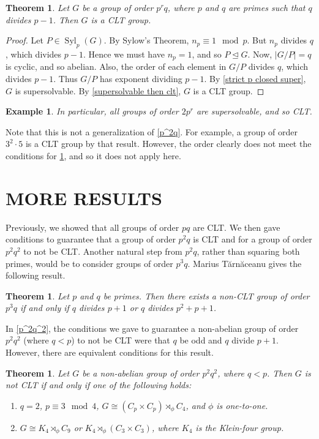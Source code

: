 \documentclass[12pt]{report}
\theoremstyle{newthm}
\newtheorem{Theorem}[lem]{Theorem}
\newtheorem{Example}[lem]{Example}
\DeclareMathOperator{\Syl}{Syl}
\begin{document}
\begin{Theorem}\label{p^rq clt} Let $G$ be a group of order $p^rq$, where $p$ and $q$ are primes such that $q$ divides $p-1$. Then $G$ is a CLT group.
\end{Theorem}

\begin{proof}
Let $P\in\Syl_p(G)$. By Sylow's Theorem, $n_p\equiv 1 \mod p$. But $n_p$ divides $q$, which divides $p-1$. Hence we must have $n_p=1$, and so $P\trianglelefteq G$. Now, $|G/P| = q$ is cyclic, and so abelian. Also, the order of each element in $G/P$ divides $q$, which divides $p-1$. Thus $G/P$ has exponent dividing $p-1$. By \cref{strict p closed super}, $G$ is supersolvable. By \cref{supersolvable then clt}, $G$ is a CLT group.
\end{proof}

\begin{Example}
In particular, all groups of order $2p^r$ are supersolvable, and so CLT.
\end{Example}

Note that this is not a generalization of \cref{p^2q}. For example, a group of order $3^2\cdot 5$ is a CLT group by that result. However, the order clearly does not meet the conditions for \cref{p^rq clt}, and so it does not apply here.


\newpage
\section{MORE RESULTS}
\bigskip

Previously, we showed that all groups of order $pq$ are CLT. We then gave conditions to guarantee that a group of order $p^2q$ is CLT and for a group of order $p^2q^2$ to not be CLT. Another natural step from $p^2q$, rather than squaring both primes, would be to consider groups of order $p^3q$. Marius T\u arn\u aceanu gives the following result. 

\begin{Theorem}\label{p^3q}\cite[Theorem 1.1]{MT} Let $p$ and $q$ be primes. Then there exists a non-CLT group of order $p^3q$ if and only if $q$ divides $p+1$ or $q$ divides $p^2+p+1$.
\end{Theorem}

In \cref{p^2q^2}, the conditions we gave to guarantee a non-abelian group of order $p^2q^2$ (where $q<p$) to not be CLT were that $q$ be odd and $q$ divide $p+1$. However, there are equivalent conditions for this result.

\begin{Theorem}\label{p^2q^2 equiv} \cite[pg 2]{Baskaran} Let $G$ be a non-abelian group of order $p^2q^2$, where $q<p$. Then $G$ is not CLT if and only if one of the following holds:\\
{\singlespacing 
\begin{enumerate}[nosep]
    \item $q=2$, $p\equiv 3 \mod 4$, $G\cong (C_p\times C_p)\rtimes_\phi C_4$, and $\phi$ is one-to-one.
    \item $G\cong K_4\rtimes_\phi C_9$ or $K_4\rtimes_\phi(C_3\times C_3)$, where $K_4$ is the Klein-four group.
\end{enumerate}
}
\end{Theorem}
\end{document}
